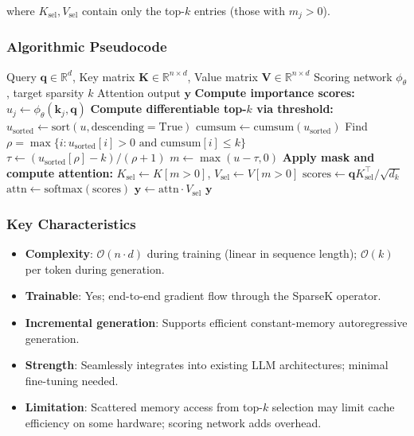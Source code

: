 where $K_{\text{sel}}, V_{\text{sel}}$ contain only the top-$k$ entries (those with $m_j > 0$).

\subsubsection{Algorithmic Pseudocode}

\begin{algorithm}[H]
\caption{SparseK: Differentiable Top-$k$ Attention}
\begin{algorithmic}[1]
\Require Query $\mathbf{q} \in \mathbb{R}^d$, Key matrix $\mathbf{K} \in \mathbb{R}^{n \times d}$, Value matrix $\mathbf{V} \in \mathbb{R}^{n \times d}$
\Require Scoring network $\phi_\theta$, target sparsity $k$
\Ensure Attention output $\mathbf{y}$
\State \textbf{Compute importance scores:}
    \State $u_j \gets \phi_\theta(\mathbf{k}_j, \mathbf{q})$
\EndFor
\State \textbf{Compute differentiable top-$k$ via threshold:}
\State $u_{\text{sorted}} \gets \text{sort}(u, \text{descending}=\text{True})$
\State $\text{cumsum} \gets \text{cumsum}(u_{\text{sorted}})$
\State Find $\rho = \max\{i : u_{\text{sorted}}[i] > 0 \text{ and cumsum}[i] \leq k\}$
\State $\tau \gets (u_{\text{sorted}}[\rho] - k) / (\rho + 1)$ 
\State $m \gets \max(u - \tau, 0)$ 
\State \textbf{Apply mask and compute attention:}
\State $K_{\text{sel}} \gets K[m > 0]$, $V_{\text{sel}} \gets V[m > 0]$
\State $\text{scores} \gets \mathbf{q} K_{\text{sel}}^\top / \sqrt{d_k}$
\State $\text{attn} \gets \text{softmax}(\text{scores})$
\State $\mathbf{y} \gets \text{attn} \cdot V_{\text{sel}}$
\Return $\mathbf{y}$
\end{algorithmic}
\end{algorithm}

\subsubsection{Key Characteristics}

\begin{itemize}[leftmargin=*]
    \item \textbf{Complexity}: $\mathcal{O}(n \cdot d)$ during training (linear in sequence length); $\mathcal{O}(k)$ per token during generation.
    \item \textbf{Trainable}: Yes; end-to-end gradient flow through the SparseK operator.
    \item \textbf{Incremental generation}: Supports efficient constant-memory autoregressive generation.
    \item \textbf{Strength}: Seamlessly integrates into existing LLM architectures; minimal fine-tuning needed.
    \item \textbf{Limitation}: Scattered memory access from top-$k$ selection may limit cache efficiency on some hardware; scoring network adds overhead.
\end{itemize}

